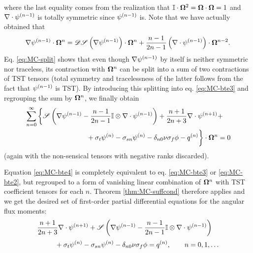 where the last equality comes from the realization that $\eye\cdot\bomega^2 = \bomega\cdot\bomega = 1$ and 
$\nabla\cdot\fmom[n-1]$ is totally symmetric since $\fmom[n-1]$ is. 
Note that we have actually obtained that
\begin{equation}\label{eq:MC-split}
  \nabla\fmom[n-1]\contr\bomega^n = \detr\Sym{\nabla\fmom[n-1]}\contr\bomega^n + 
  \frac{n-1}{2n-1}\left(\nabla\cdot\fmom[n-1]\right)\contr\bomega^{n-2}.
\end{equation}
Eq. \eqref{eq:MC-split} shows that even though $\nabla\fmom[n-1]$ by itself is neither symmetric nor traceless, its 
contraction with $\bomega^n$ can be split into a sum of two contractions of TST tensors (total symmetry and 
tracelessness of the latter follows from the fact that $\fmom[n-1]$ is TST). By introducing this splitting into eq. 
\eqref{eq:MC-bte3} and regrouping the sum by $\bomega^n$, we finally obtain
\begin{equation}\label{eq:MC-bte4}
\begin{multlined}
  \suma[n]{0}{\infty}\left\{\Sym{\nabla\fmom[n-1] - \frac{n-1}{2n-1}\eye\otimes\nabla\cdot\fmom[n-1]} + \frac{n+1}{2n+3}\nabla\cdot\fmom[n+1]+\right.\\
  \left.\vphantom{\Sym{\nabla\fmom[n-1] - \frac{n-1}{2n-1}\eye\otimes\nabla\cdot\fmom[n-1]} + \frac{n+1}{2n+3}\nabla\cdot\fmom[n+1]}
     + \sigma_t\fmom - \sigma_{sn}\fmom - \kron{n}{0}\nu\sigma_f\phi - \qmom
  \right\}\contr\bomega^n = 0
\end{multlined}
\end{equation}
(again with the non-sensical tensors with negative ranks discarded).

Equation \eqref{eq:MC-bte4} is completely equivalent to eq. \eqref{eq:MC-bte3} or \eqref{eq:MC-bte2}, but regrouped to a
form of vanishing linear combination of $\bomega^n$ with TST coefficient tensors for each $n$. Theorem
\ref{thm:MC-suffcond} therefore applies and we get the desired set of first-order partial differential equations for the
angular flux moments:
\begin{equation}\label{eq:MC-set}
\begin{multlined}
  \frac{n+1}{2n+3}\nabla\cdot\fmom[n+1] + \Sym{\nabla\fmom[n-1] - \frac{n-1}{2n-1}\eye\otimes\nabla\cdot\fmom[n-1]}
  \\[.2em]+ \sigma_t\fmom - \sigma_{sn}\fmom - \kron{n}{0}\nu\sigma_f\phi = \qmom,\qquad n = 0,1,\ldots
\end{multlined}
\end{equation}

